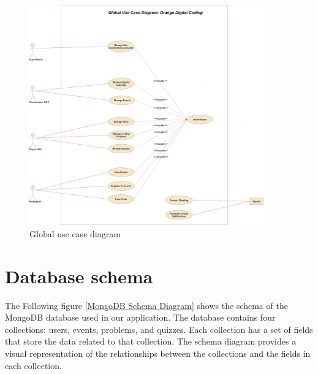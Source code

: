 \begin{figure}[h!]
      \centering
      \includegraphics[height=1\textwidth, width=0.9\textwidth]{images/generalUseCase.png}
      \caption{Global use case diagram}\label{fig:use_case_diagram}
\end{figure}


\section{Database schema}
The Following figure \ref{MongoDB Schema Diagram} shows the schema of the MongoDB database used in our application.
The database contains four collections: users, events, problems, and quizzes. Each collection has a set of fields
that store the data related to that collection. The schema diagram provides a visual representation of the relationships
between the collections and the fields in each collection.


